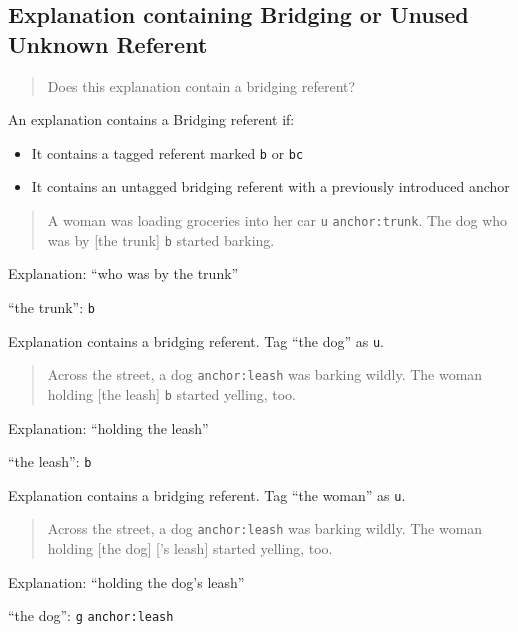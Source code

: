 \documentclass[
]{book}
\providecommand{\tightlist}{%
  \setlength{\itemsep}{0pt}\setlength{\parskip}{0pt}}
\begin{document}
\hypertarget{explanation-containing-bridging-or-unused-unknown-referent}{%
\subsection{Explanation containing Bridging or Unused Unknown Referent}\label{explanation-containing-bridging-or-unused-unknown-referent}}

\begin{quote}
Does this explanation contain a bridging referent?
\end{quote}

An explanation contains a Bridging referent if:

\begin{itemize}
\tightlist
\item
  It contains a tagged referent marked \texttt{b} or \texttt{bc}
\item
  It contains an untagged bridging referent with a previously introduced anchor
\end{itemize}

\begin{quote}
A woman was loading groceries into her car \texttt{u} \texttt{anchor:trunk}.
The dog who was by {[}the trunk{]} \texttt{b} started barking.
\end{quote}

Explanation: ``who was by the trunk''

``the trunk'': \texttt{b}

Explanation contains a bridging referent.
Tag ``the dog'' as \texttt{u}.

\begin{quote}
Across the street, a dog \texttt{anchor:leash} was barking wildly.
The woman holding {[}the leash{]} \texttt{b} started yelling, too.
\end{quote}

Explanation: ``holding the leash''

``the leash'': \texttt{b}

Explanation contains a bridging referent.
Tag ``the woman'' as \texttt{u}.

\begin{quote}
Across the street, a dog \texttt{anchor:leash} was barking wildly.
The woman holding {[}the dog{]} {[}'s leash{]} started yelling, too.
\end{quote}

Explanation: ``holding the dog's leash''

``the dog'': \texttt{g} \texttt{anchor:leash}
\end{document}
